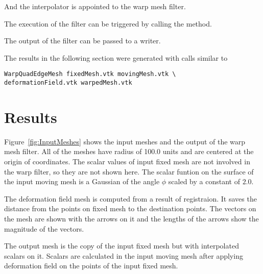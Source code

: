 \documentclass{InsightArticle}
\begin{document}
\begin{center}

\end{center}

And the interpolator is appointed to the warp mesh filter.

\begin{center}

\end{center}

The execution of the filter can be triggered by calling the  method.

\begin{center}

\end{center}

The output of the filter can be passed to a writer. 

\begin{center}

\end{center}

The results in the following section were generated with calls similar to

\begin{verbatim}
WarpQuadEdgeMesh fixedMesh.vtk movingMesh.vtk \
deformationField.vtk warpedMesh.vtk 
\end{verbatim}


\section{Results}

Figure~\ref{fig:InputMeshes} shows the input meshes and the output of the warp mesh filter.
All of the meshes have radius of 100.0 units and are centered at the origin of coordinates.
The scalar values of input fixed mesh are not involved in the warp filter, so they are not 
shown here. The scalar funtion on the surface of the input moving
mesh is a Gaussian of the angle $\phi$ scaled by a constant of $2.0$.

The deformation field mesh is computed from a result of registraion. It saves the distance 
from the points on fixed mesh to the destination points. The vectors on the mesh are shown
with the arrows on it and the lengths of the arrows show the magnitude of the vectors.

The output mesh is the copy of the input fixed mesh but with interpolated scalars on it.
Scalars are calculated in the input moving mesh after applying deformation field on the points 
of the input fixed mesh.
\end{document}
